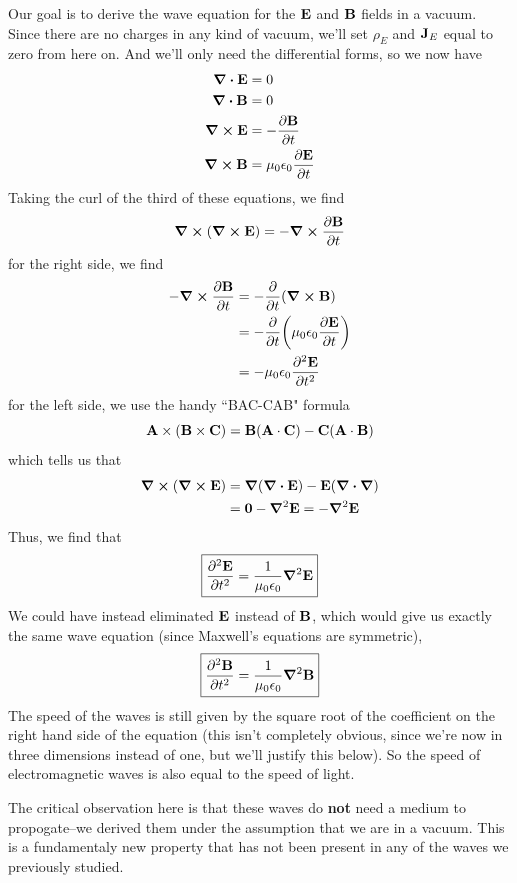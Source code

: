 Our goal is to derive the wave equation for the $\mathbf{E}$ and $\mathbf{B}$ fields in a vacuum. Since there are no charges in any kind of vacuum, we'll set $\rho_E$ and $\mathbf{J}_E$ equal to zero from here on. And we'll only need the differential forms, so we now have
\begin{align*}
    \div  \mathbf{E} &= 0 \\
    \div  \mathbf{B} &= 0 \\
    \curl \mathbf{E} &= -\pdv{\mathbf{B}}{t} \\
    \curl \mathbf{B} &= \mu_0\epsilon_0 \pdv{\mathbf{E}}{t} 
\end{align*}
Taking the curl of the third of these equations, we find
\[ \curl(\curl \mathbf{E})  =-\curl \pdv{\mathbf{B}}{t} \]
for the right side, we find
\begin{align*}
    -\curl \pdv{\mbf B}{t} &= -\pdv{t}\pqty{\curl \mbf B} \\
    &= -\pdv{t} \pqty{\mu_0\epsilon_0\pdv{\mbf E}{t}} \\
    &= -\mu_0\epsilon_0 \pdv[2]{\mbf E}{t}
\end{align*}
for the left side, we use the handy ``BAC-CAB" formula
\[ \mathbf{A} \times (\mathbf{B} \times \mathbf{C}) = \mathbf{B}(\mathbf{A} \cdot \mathbf{C}) - \mathbf{C}(\mathbf{A}\cdot \mathbf{B})\]
which tells us that
\begin{align*}
    \curl(\curl \mathbf{E}) &= \grad(\div \mathbf{E}) - \mathbf{E}(\div \grad) \\
    &= \mathbf{0} - \grad^2\mathbf{E} = -\grad^2\mathbf{E}
\end{align*}
Thus, we find that
\[ \boxed{\pdv[2]{\mathbf{E}}{t} = \frac{1}{\mu_0\epsilon_0} \grad^2\mathbf{E}} \]
We could have instead eliminated $\mathbf{E}$ instead of $\mathbf{B}$, which would give us exactly the same wave equation (since Maxwell's equations are symmetric),
\[ \boxed{\pdv[2]{\mathbf{B}}{t} = \frac{1}{\mu_0\epsilon_0} \grad^2\mathbf{B}} \]
The speed of the waves is still given by the square root of the coefficient on the right hand side of the equation (this isn't completely obvious, since we're now in three dimensions instead of one, but we'll justify this below). So the speed of electromagnetic waves is also equal to the speed of light.

The critical observation here is that these waves do \textbf{not} need a medium to propogate--we derived them under the assumption that we are in a vacuum. This is a fundamentaly new property that has not been present in any of the waves we previously studied.

